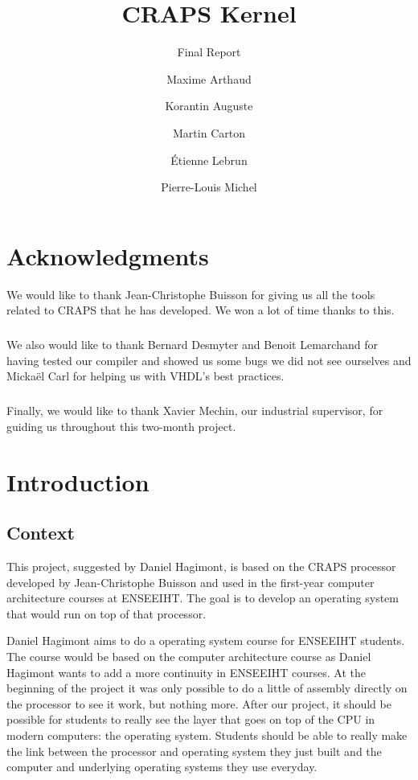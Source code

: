 \documentclass[openany, a4paper]{book}
\title{CRAPS Kernel}
\subtitle{Final Report}
\author{
       Maxime Arthaud
  \and Korantin Auguste
  \and Martin Carton
  \and Étienne Lebrun
  \and Pierre-Louis Michel
}
\begin{document}
  

  \chapter*{Acknowledgments}
    We would like to thank Jean-Christophe Buisson for giving us all the tools
    related to CRAPS that he has developed. We won a lot of time thanks to this.

    \paragraph{}
    We also would like to thank Bernard Desmyter and Benoit Lemarchand for
    having tested our compiler and showed us some bugs we did not see ourselves
    and Mickaël Carl for helping us with VHDL's best practices.

    \paragraph{}
    Finally, we would like to thank Xavier Mechin, our industrial supervisor,
    for guiding us throughout this two-month project.

  \tableofcontents

  \chapter{Introduction}
    \section{Context}
      This project, suggested by Daniel Hagimont, is based on the CRAPS
      processor developed by Jean-Christophe Buisson and used in the first-year
      computer architecture courses at ENSEEIHT. The goal is to develop an
      operating system that would run on top of that processor.

      Daniel Hagimont aims to do a operating system course for ENSEEIHT
      students. The course would be based on the computer architecture course as
      Daniel Hagimont wants to add a more continuity in ENSEEIHT courses. At the
      beginning of the project it was only possible to do a little of assembly
      directly on the processor to see it work, but nothing more.
      After our project, it should be possible for students to really see
      the layer that goes on top of the CPU in modern computers: the operating
      system. Students should be able to really make the link between the
      processor and operating system they just built and the computer and
      underlying operating systems they use everyday.
\end{document}
